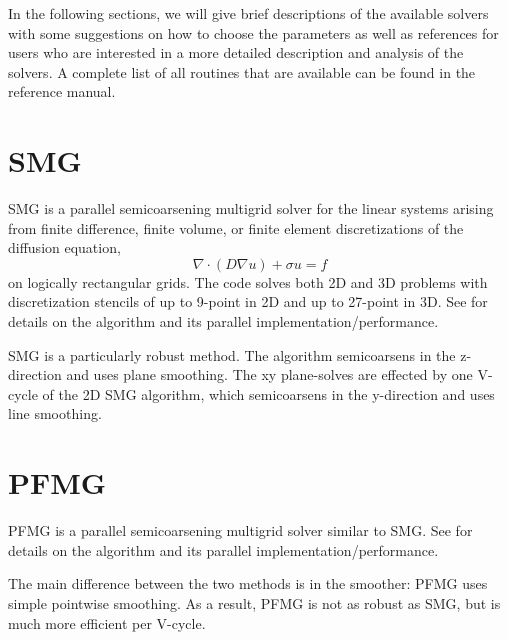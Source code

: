 In the following sections, we will give brief descriptions of the available \hypre{} solvers
with some suggestions on how to choose the parameters as well as references for users 
who are interested in a more detailed description and analysis of the solvers.
A complete list of all routines that are available can be found in the reference manual.


\section{SMG}

SMG is a parallel semicoarsening multigrid solver for the linear
systems arising from finite difference, finite volume, or finite
element discretizations of the diffusion equation,
\begin{equation}
\nabla \cdot ( D \nabla u ) + \sigma u = f
\end{equation}
on logically rectangular grids.  The code solves both 2D and 3D
problems with discretization stencils of up to 9-point in 2D and up to
27-point in 3D.  See
\cite{SSchaffer_1998a,PNBrown_RDFalgout_JEJones_2000,RDFalgout_JEJones_2000}
for details on the algorithm and its parallel implementation/performance.

SMG is a particularly robust method.  The algorithm semicoarsens in
the z-direction and uses plane smoothing.  The xy plane-solves are
effected by one V-cycle of the 2D SMG algorithm, which semicoarsens in
the y-direction and uses line smoothing.


\section{PFMG}

PFMG is a parallel semicoarsening multigrid solver similar to SMG.
See \cite{SFAshby_RDFalgout_1996,RDFalgout_JEJones_2000} for details
on the algorithm and its parallel implementation/performance.

The main difference between the two methods is in the smoother: PFMG
uses simple pointwise smoothing.  As a result, PFMG is not as robust
as SMG, but is much more efficient per V-cycle.


